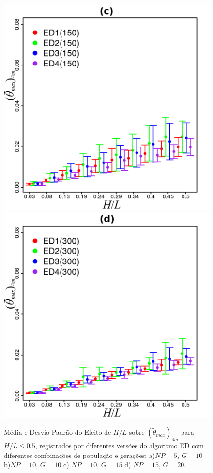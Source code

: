 \documentclass[12pt,A4,A4pt]{article}
\begin{document}
\begin{figure}[!htbp]
\quad
\includegraphics[scale=.98]{imgs/plot_deall150_rdata_std_003-05.png}
\quad
\includegraphics[scale=.98]{imgs/plot_deall300_rdata_std_003-05.png}

\caption{\fontsize{10pt}{\baselineskip}\selectfont Média e Desvio Padrão do Efeito de $H/L$ sobre $({\tilde{\theta}}_{max})_{4m}$ para $H/L\leqslant0.5$, registrados por diferentes versões do algoritmo ED com diferentes combinações de população e gerações: a)$NP=5$, $G=10$ b)$NP=10$, $G=10$ c) $NP=10$, $G=15$ d) $NP=15$, $G=20$.}
\label{stddeall}
\end{figure}
\end{document}
